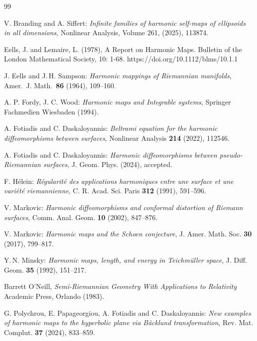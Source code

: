 \documentclass[12pt]{amsart}
\begin{document}
\begin{thebibliography}{99}

V. Branding and A. Siffert:
\emph{Infinite families of harmonic self-maps of ellipsoids in all
dimensions}, Nonlinear Analysis, Volume 261, (2025), 113874.

Eells, J. and Lemaire, L. (1978), A Report on Harmonic Maps. Bulletin of the London Mathematical Society, 10: 1-68. https://doi.org/10.1112/blms/10.1.1

J. Eells and J.\,H. Sampson:
\emph{Harmonic mappings of Riemannian manifolds},
Amer.\ J. Math.\ \textbf{86} (1964), 109--160.

A. P. Fordy, J. C. Wood:
\emph{Harmonic maps and Integrable systems}, 
Springer Fachmedien Wiesbaden (1994).

A. Fotiadis and C. Daskaloyannis:
\emph{Beltrami equation for the harmonic diffeomorphisms between
surfaces}, Nonlinear Analysis \textbf{214} (2022), 112546.

A. Fotiadis and C. Daskaloyannis:
\emph{Harmonic diffeomorphisms between pseudo-Riemannian surfaces},
J. Geom. Phys. (2024), accepted.

F. H\'{e}lein:
\emph{R\'{e}gularit\'{e} des applications harmoniques entre une surface
et une vari\'{e}t\'{e} riemannienne},
C. R. Acad. Sci. Paris \textbf{312} (1991), 591--596.

V. Markovic:
\emph{Harmonic diffeomorphisms and conformal distortion of Riemann
surfaces}, Comm. Anal. Geom. \textbf{10} (2002), 847--876.

V. Markovic:
\emph{Harmonic maps and the Schoen conjecture},
J. Amer. Math. Soc. \textbf{30} (2017), 799--817.

Y.\,N. Minsky:
\emph{Harmonic maps, length, and energy in Teichm\"{u}ller space},
J. Diff. Geom. \textbf{35} (1992), 151--217.

Barrett O'Neill,
\emph{Semi-Riemannian Geometry With Applications to Relativity}   Academic Press, Orlando (1983).

G. Polychrou, E. Papageorgiou, A. Fotiadis and C. Daskaloyannis:
\emph{New examples of harmonic maps to the hyperbolic plane via
B\"{a}cklund transformation},
Rev. Mat. Complut. \textbf{37} (2024), 833--859.


\end{thebibliography}
\end{document}
